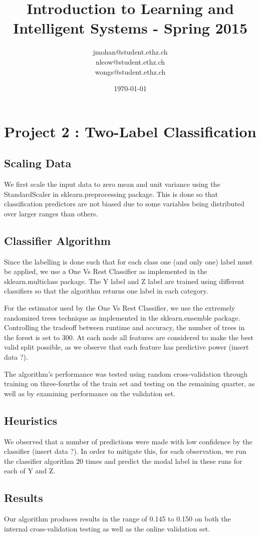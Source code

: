 \documentclass[a4paper, 11pt]{article}
\title{Introduction to Learning and Intelligent Systems - Spring 2015}
\author{jmohan@student.ethz.ch\\ nleow@student.ethz.ch\\ wongs@student.ethz.ch\\}
\date{\today}
\begin{document}
\maketitle

\section*{Project 2 : Two-Label Classification}

\subsection*{Scaling Data}

We first scale the input data to zero mean and unit variance using the StandardScaler in sklearn.preprocessing package. This is done so that classification predictors are not biased due to some variables being distributed over larger ranges than others.

\subsection*{Classifier Algorithm}

Since the labelling is done such that for each class one (and only one) label must be applied, we use a One Vs Rest Classifier as implemented in the sklearn.multiclass package. The Y label and Z label are trained using different classifiers so that the algorithm returns one label in each category.

For the estimator used by the One Vs Rest Classifier, we use the extremely randomized trees technique as implemented in the sklearn.ensemble package. Controlling the tradeoff between runtime and accuracy, the number of trees in the forest is set to 300. At each node all features are considered to make the best valid split possible, as we observe that each feature has predictive power (insert data ?).

The algorithm's performance was tested using random cross-validation through training on three-fourths of the train set and testing on the remaining quarter, as well as by examining performance on the validation set.

\subsection*{Heuristics}

We observed that a number of predictions were made with low confidence by the classifier (insert data ?). In order to mitigate this, for each observation, we run the classifier algorithm 20 times and predict the modal label in these runs for each of Y and Z. 

\subsection*{Results}

Our algorithm produces results in the range of 0.145 to 0.150 on both the internal cross-validation testing as well as the online validation set.
\end{document}
